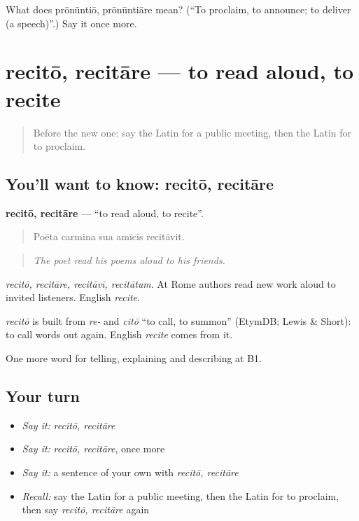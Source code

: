 \begin{tcolorbox}[breakable,colback=teal!4,colframe=teal!35!black,title={Before you move on}]
What does prōnūntiō, prōnūntiāre mean? (\textquotedblleft{}To proclaim, to announce; to deliver (a speech)\textquotedblright{}.) Say it once more.
\end{tcolorbox}
\section[recitō, recitāre]{recitō, recitāre — to read aloud, to recite}

\label{lesson:LA-C371-recito}



\begin{quote}
Before the new one: say the Latin for a public meeting, then the Latin for to proclaim.
\end{quote}

\subsection*{You'll want to know: recitō, recitāre}
\textbf{recitō, recitāre} — \textquotedblleft{}to read aloud, to recite\textquotedblright{}.

\begin{quote}
Poēta carmina sua amīcīs recitāvit.
\end{quote}

\begin{quote}
\emph{The poet read his poems aloud to his friends.}
\end{quote}

\emph{recitō, recitāre, recitāvī, recitātum}. At Rome authors read new work aloud to invited listeners. English \emph{recite}.

\begin{cousinweb}
\emph{recitō} is built from \emph{re-} and \emph{citō} \textquotedblleft{}to call, to summon\textquotedblright{} (EtymDB; Lewis \& Short): to call words out again. English \emph{recite} comes from it.
\end{cousinweb}

\begin{grammarlens}[title={What you've built}]
One more word for telling, explaining and describing at B1.
\end{grammarlens}

\subsection*{Your turn}
\begin{itemize}
\raggedright
  \item \emph{Say it:} \emph{recitō, recitāre}
  \item \emph{Say it:} \emph{recitō, recitāre}, once more
  \item \emph{Say it:} a sentence of your own with \emph{recitō, recitāre}
  \item \emph{Recall:} say the Latin for a public meeting, then the Latin for to proclaim, then say \emph{recitō, recitāre} again
\end{itemize}

